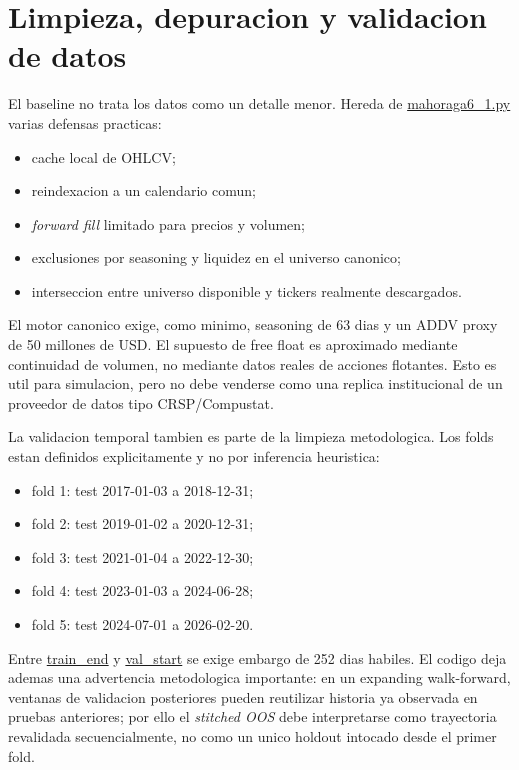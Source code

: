 \documentclass[11pt,letterpaper]{article}
\newcommand{\code}[1]{{\urlstyle{tt}\url{#1}}}
\begin{document}
\section{Limpieza, depuracion y validacion de datos}
El baseline no trata los datos como un detalle menor. Hereda de \code{mahoraga6_1.py} varias defensas practicas:

\begin{itemize}
    \item cache local de OHLCV;
    \item reindexacion a un calendario comun;
    \item \emph{forward fill} limitado para precios y volumen;
    \item exclusiones por seasoning y liquidez en el universo canonico;
    \item interseccion entre universo disponible y tickers realmente descargados.
\end{itemize}

El motor canonico exige, como minimo, seasoning de 63 dias y un ADDV proxy de 50 millones de USD. El supuesto de free float es aproximado mediante continuidad de volumen, no mediante datos reales de acciones flotantes. Esto es util para simulacion, pero no debe venderse como una replica institucional de un proveedor de datos tipo CRSP/Compustat.

La validacion temporal tambien es parte de la limpieza metodologica. Los folds estan definidos explicitamente y no por inferencia heuristica:

\begin{itemize}
    \item fold 1: test 2017-01-03 a 2018-12-31;
    \item fold 2: test 2019-01-02 a 2020-12-31;
    \item fold 3: test 2021-01-04 a 2022-12-30;
    \item fold 4: test 2023-01-03 a 2024-06-28;
    \item fold 5: test 2024-07-01 a 2026-02-20.
\end{itemize}

Entre \code{train_end} y \code{val_start} se exige embargo de 252 dias habiles. El codigo deja ademas una advertencia metodologica importante: en un expanding walk-forward, ventanas de validacion posteriores pueden reutilizar historia ya observada en pruebas anteriores; por ello el \emph{stitched OOS} debe interpretarse como trayectoria revalidada secuencialmente, no como un unico holdout intocado desde el primer fold.
\end{document}
